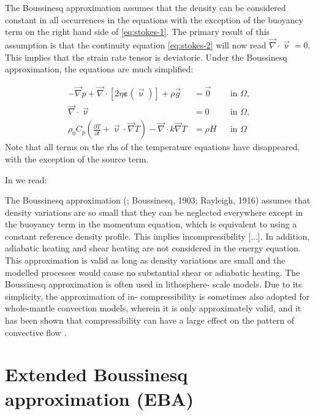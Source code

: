 \documentclass[a4paper,12pt]{article}
\begin{document}
The Boussinesq approximation assumes that the density can be
considered constant in all occurrences in the equations with the exception of
the buoyancy term on the right hand side of \eqref{eq:stokes-1}. The primary
result of this assumption is that the continuity equation \eqref{eq:stokes-2}
will now read ${\vec \nabla}\cdot{\vec \upnu} = 0$.
This implies that the strain rate tensor is deviatoric.
Under the Boussinesq approximation, the equations are much simplified:

\begin{align}
  -\vec\nabla p + \vec\nabla \cdot \left[2\eta \dot{\bm \varepsilon}(\vec\upnu) \right] + \rho \vec{g} &= \vec{0}
  &
  & \textrm{in $\Omega$},  \\
  \vec\nabla \cdot  \vec\upnu &= 0 
  &
  & \textrm{in $\Omega$},
  \\
  \rho_0 C_p \left(\frac{\partial T}{\partial t} + \vec\upnu \cdot\vec\nabla T\right)
  - \vec\nabla\cdot k\vec\nabla T
  &=
  \rho H
  &
  & \textrm{in $\Omega$}
\end{align}
Note that all terms on the rhs of the temperature equations have disappeared, with the exception 
of the source term.

In \textcite{vacp22} we read: 
\begin{displayquote}
The Boussinesq approximation (\textcite{ober79}; Boussinesq, 1903; Rayleigh, 1916) 
assumes that density
variations are so small that they can be neglected everywhere
except in the buoyancy term in the momentum equation, 
which is equivalent to using a constant reference density profile. 
This implies incompressibility [...]. In addition, adiabatic heating
and shear heating are not considered in the energy equation. 
This approximation is valid as long as density variations are small 
and the modelled processes would cause no substantial 
shear or adiabatic heating.
The Boussinesq approximation is often used in lithosphere-
scale models. Due to its simplicity, the approximation of in-
compressibility is sometimes also adopted for whole-mantle
convection models, wherein it is only approximately valid,
and it has been shown that compressibility can have a large
effect on the pattern of convective flow \cite{tack96}.
\end{displayquote}





\newpage
\section{Extended Boussinesq approximation (EBA)}
\end{document}
